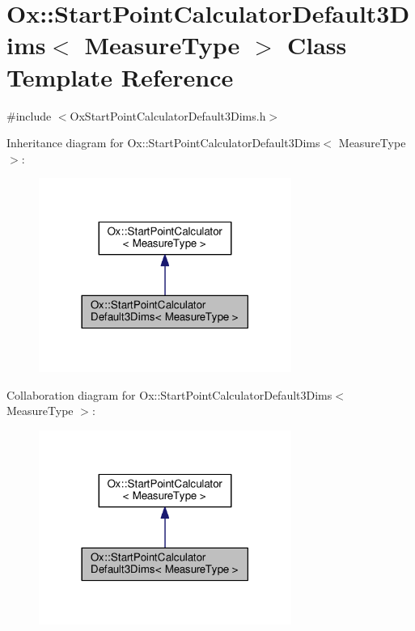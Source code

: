 \hypertarget{class_ox_1_1_start_point_calculator_default3_dims}{\section{Ox\-:\-:Start\-Point\-Calculator\-Default3\-Dims$<$ Measure\-Type $>$ Class Template Reference}
\label{class_ox_1_1_start_point_calculator_default3_dims}
}


{\ttfamily \#include $<$Ox\-Start\-Point\-Calculator\-Default3\-Dims.\-h$>$}



Inheritance diagram for Ox\-:\-:Start\-Point\-Calculator\-Default3\-Dims$<$ Measure\-Type $>$\-:
\nopagebreak
\begin{figure}[H]
\begin{center}
\leavevmode
\includegraphics[width=234pt]{class_ox_1_1_start_point_calculator_default3_dims__inherit__graph}
\end{center}
\end{figure}


Collaboration diagram for Ox\-:\-:Start\-Point\-Calculator\-Default3\-Dims$<$ Measure\-Type $>$\-:
\nopagebreak
\begin{figure}[H]
\begin{center}
\leavevmode
\includegraphics[width=234pt]{class_ox_1_1_start_point_calculator_default3_dims__coll__graph}
\end{center}
\end{figure}
